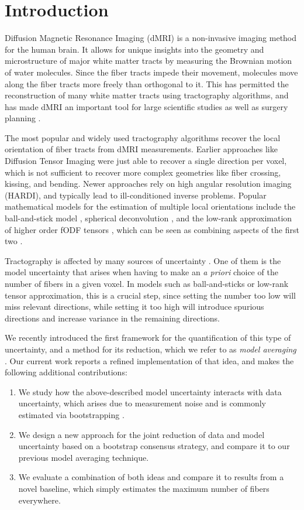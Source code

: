 \section{Introduction}
Diffusion Magnetic Resonance Imaging (dMRI) \cite{LeBihan:1986} is a
non-invasive imaging method for the human brain. It allows for
unique insights into the geometry and microstructure of major white matter tracts by measuring the Brownian motion of water molecules. Since
the fiber tracts impede their movement, molecules move along the fiber tracts
more freely than orthogonal to it. This has permitted the reconstruction of many white matter tracts using tractography algorithms, and has made dMRI an important tool for large
scientific studies \cite{Sotiropoulos:2013, Tobisch:2018Frontiers} as well as surgery planning \cite{Yang:2021}.

The most popular and widely used tractography algorithms recover the local
orientation of fiber tracts from dMRI measurements. Earlier approaches like
Diffusion Tensor Imaging \cite{BASSER1994247}
were just able to recover a single direction per voxel, which is not sufficient
to recover more complex geometries like fiber crossing, kissing, and bending.
Newer approaches rely on high angular resolution imaging (HARDI), and typically lead to ill-conditioned inverse problems. Popular mathematical models for the estimation of multiple local orientations include the
ball-and-stick model \cite{BEHRENS2007144}, spherical deconvolution \cite{TOURNIER20071459}, and the low-rank approximation of higher order fODF tensors
\cite{lowrank}, which can be seen as combining aspects of the first two \cite{Schultz:MICCAI10}.

Tractography is affected by many sources of uncertainty \cite{Schultz:SciVisBook2014}. One of them is the model uncertainty that arises when having to make an \emph{a priori} choice of the number of fibers in a given voxel. In models such as ball-and-sticks or low-rank tensor approximation, this is a
crucial step, since setting the number too low will miss relevant directions, while setting it too high will introduce spurious directions and increase variance in the remaining directions.

We recently introduced the first framework for the quantification of this type of uncertainty, and a method for its reduction, which we refer to as \emph{model averaging} \cite{Gruen:2021}. Our current work reports a refined implementation of that idea, and makes the following additional contributions:
\begin{enumerate}
\item We study how the above-described model uncertainty interacts with data uncertainty, which arises due to measurement noise and is commonly estimated via bootstrapping \cite{Chung:2006}.
\item We design a new approach for the joint reduction of data and model uncertainty based on a bootstrap consensus strategy, and compare it to our previous model averaging technique.
\item We evaluate a combination of both ideas and compare it to results from a novel baseline, which simply estimates the maximum number of fibers everywhere.
\end{enumerate}

